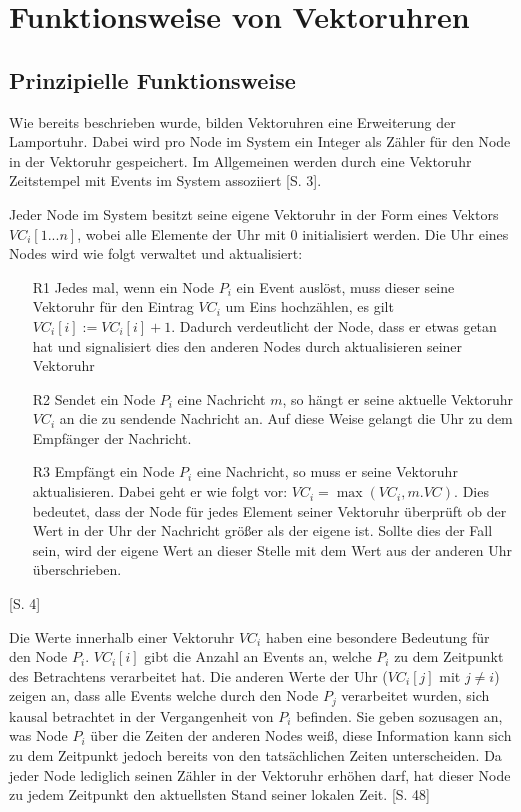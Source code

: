 \section{Funktionsweise von Vektoruhren}
\subsection{Prinzipielle Funktionsweise}

Wie bereits beschrieben wurde, bilden Vektoruhren eine Erweiterung der Lamportuhr. Dabei wird pro Node im System ein Integer als Zähler für den Node in der Vektoruhr gespeichert. Im Allgemeinen werden durch eine Vektoruhr Zeitstempel mit Events im System assoziiert \cite{Baldoni:2002:FDC:1435723.1437765}[S. 3].

Jeder Node im System besitzt seine eigene Vektoruhr in der Form eines Vektors $VC_i[1...n]$, wobei alle Elemente der Uhr mit $0$ initialisiert werden. Die Uhr eines Nodes wird wie folgt verwaltet und aktualisiert:

\begin{itemize}
	\item[R1]Jedes mal, wenn ein Node $P_i$ ein Event auslöst, muss dieser seine Vektoruhr für den Eintrag $VC_i$ um Eins hochzählen, es gilt  $VC_i[i] := VC_i[i] + 1$. Dadurch verdeutlicht der Node, dass er etwas getan hat und signalisiert dies den anderen Nodes durch aktualisieren seiner Vektoruhr 
	\item[R2]Sendet ein Node $P_i$ eine Nachricht $m$, so hängt er seine aktuelle Vektoruhr $VC_i$ an die zu sendende Nachricht an. Auf diese Weise gelangt die Uhr zu dem Empfänger der Nachricht.
	\item[R3]Empfängt ein Node $P_i$ eine Nachricht, so muss er seine Vektoruhr aktualisieren. Dabei geht er wie folgt vor: $VC_i = \max(VC_i, m.VC)$. Dies bedeutet, dass der Node für jedes Element seiner Vektoruhr überprüft ob der Wert in der Uhr der Nachricht größer als der eigene ist. Sollte dies der Fall sein, wird der eigene Wert an dieser Stelle mit dem Wert aus der anderen Uhr überschrieben.\label{R3}
\end{itemize} \cite{Baldoni:2002:FDC:1435723.1437765}[S. 4]

Die Werte innerhalb einer Vektoruhr $VC_i$ haben eine besondere Bedeutung für den Node $P_i$. $VC_i[i]$ gibt die Anzahl an Events an, welche $P_i$ zu dem Zeitpunkt des Betrachtens verarbeitet hat. Die anderen Werte der Uhr ($VC_i[j]$ mit $j \neq i$) zeigen an, dass alle Events welche durch den Node $P_j$ verarbeitet wurden, sich kausal betrachtet in der Vergangenheit von $P_i$ befinden. Sie geben sozusagen an, was Node $P_i$ über die Zeiten der anderen Nodes weiß, diese Information kann sich zu dem Zeitpunkt jedoch bereits von den tatsächlichen Zeiten unterscheiden. Da jeder Node lediglich seinen Zähler in der Vektoruhr erhöhen darf, hat dieser Node zu jedem Zeitpunkt den aktuellsten Stand seiner lokalen Zeit. \cite{SINGHAL199247}[S. 48]

